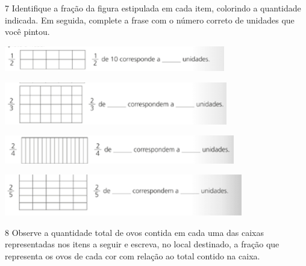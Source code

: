 \begin{mdframed}[linewidth=2pt,linecolor=salmao,roundcorner=2pt]
\begin{escolha}
{\num{7} Identifique a fração da figura estipulada em cada item, colorindo a
quantidade indicada. Em seguida, complete a frase com o número correto de
unidades que você pintou.


\begin{escolha}
\item
\includegraphics[width=3.79199in,height=0.43337in]{media/image114.png}

\item
\includegraphics[width=3.83367in,height=0.72506in]{media/image115.png}

\item
\includegraphics[width=3.95868in,height=0.48337in]{media/image116.png}

\item
\includegraphics[width=4.09202in,height=0.70839in]{media/image117.png}
\end{escolha}

\num{8} Observe a quantidade total de ovos contida em cada uma das caixas
representadas nos itens a seguir e escreva, no local destinado, a fração que
representa os ovos de cada cor com relação ao total contido na caixa.

}
\end{escolha}
\end{mdframed}
